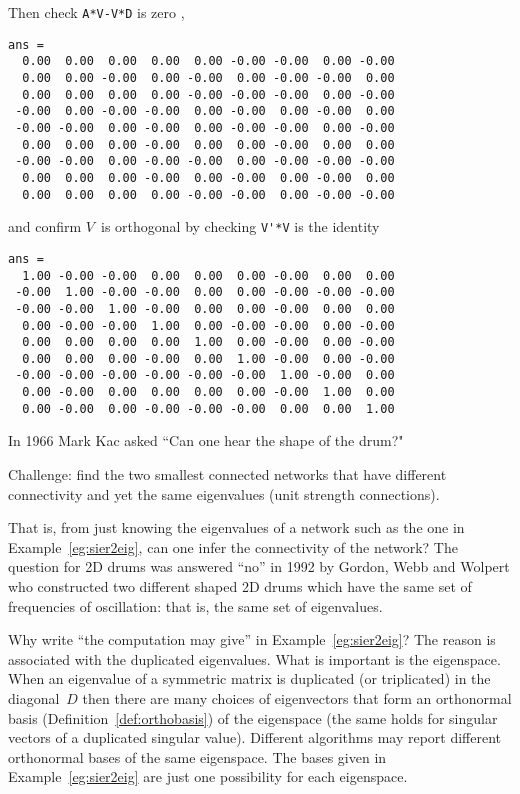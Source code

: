 \begin{example}
\begin{solution}
\begin{itemize}
\end{itemize}
Then check \verb|A*V-V*D| is zero \twodp,
{\small%
\begin{verbatim}
ans =
  0.00  0.00  0.00  0.00  0.00 -0.00 -0.00  0.00 -0.00
  0.00  0.00 -0.00  0.00 -0.00  0.00 -0.00 -0.00  0.00
  0.00  0.00  0.00  0.00 -0.00 -0.00 -0.00  0.00 -0.00
 -0.00  0.00 -0.00 -0.00  0.00 -0.00  0.00 -0.00  0.00
 -0.00 -0.00  0.00 -0.00  0.00 -0.00 -0.00  0.00 -0.00
  0.00  0.00  0.00 -0.00  0.00  0.00 -0.00  0.00  0.00
 -0.00 -0.00  0.00 -0.00 -0.00  0.00 -0.00 -0.00 -0.00
  0.00  0.00  0.00 -0.00  0.00 -0.00  0.00 -0.00  0.00
  0.00  0.00  0.00  0.00 -0.00 -0.00  0.00 -0.00 -0.00
\end{verbatim}
}
and confirm \(V\)~is orthogonal by checking \verb|V'*V| is the identity \twodp
{\small%
\begin{verbatim}
ans =
  1.00 -0.00 -0.00  0.00  0.00  0.00 -0.00  0.00  0.00
 -0.00  1.00 -0.00 -0.00  0.00  0.00 -0.00 -0.00 -0.00
 -0.00 -0.00  1.00 -0.00  0.00  0.00 -0.00  0.00  0.00
  0.00 -0.00 -0.00  1.00  0.00 -0.00 -0.00  0.00 -0.00
  0.00  0.00  0.00  0.00  1.00  0.00 -0.00  0.00 -0.00
  0.00  0.00  0.00 -0.00  0.00  1.00 -0.00  0.00 -0.00
 -0.00 -0.00 -0.00 -0.00 -0.00 -0.00  1.00 -0.00  0.00
  0.00 -0.00  0.00  0.00  0.00  0.00 -0.00  1.00  0.00
  0.00 -0.00  0.00 -0.00 -0.00 -0.00  0.00  0.00  1.00
\end{verbatim}
}
\end{solution}
\end{example}



In 1966 Mark Kac asked ``Can one hear the shape of the drum?"
\begin{aside}
Challenge: find the two smallest connected networks that have different connectivity and yet the same eigenvalues (unit strength connections).
\end{aside}%
That is, from just knowing the eigenvalues of a network such as the one in Example~\ref{eg:sier2eig}, can one infer the connectivity of the network?
The question for 2D drums was answered ``no'' in 1992 by Gordon, Webb and Wolpert who constructed two different shaped 2D drums which have the same set of frequencies of oscillation: that is, the same set of eigenvalues.

Why write ``the computation may give'' in Example~\ref{eg:sier2eig}?  
The reason is associated with the duplicated eigenvalues.
What is important is the eigenspace.
When an eigenvalue of a symmetric matrix is duplicated (or triplicated) in the diagonal~\(D\) then there are many choices of eigenvectors that form an orthonormal basis (Definition~\ref{def:orthobasis}) of the eigenspace (the same holds for singular vectors of a duplicated singular value).
Different algorithms may report different orthonormal bases of the same eigenspace.
The bases given in  Example~\ref{eg:sier2eig} are just one possibility for each eigenspace.




